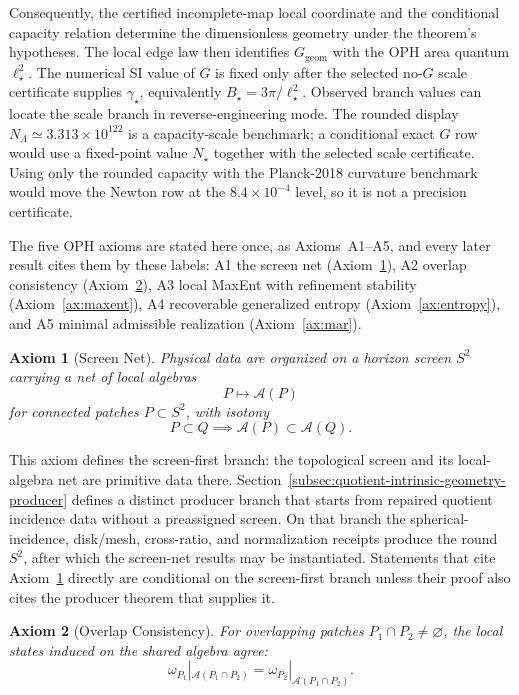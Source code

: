 \documentclass[11pt]{article}
\newtheorem{axiom}{Axiom}
\begin{document}
Consequently, the certified incomplete-map local coordinate and the conditional capacity relation
determine the dimensionless geometry under the theorem's hypotheses. The local edge
law then identifies \(G_{\mathrm{geom}}\) with the OPH area quantum \(\ell_\star^2\). The numerical
SI value of \(G\) is fixed only after the selected no-\(G\) scale certificate supplies
\(\gamma_\star\), equivalently \(B_\star=3\pi/\ell_\star^2\).
Observed branch values can locate the scale branch in reverse-engineering mode. The rounded display
\(N_{\Lambda}\simeq3.313\times10^{122}\) is a capacity-scale benchmark; a conditional exact \(G\)
row would use a fixed-point value \(N_\star\) together with the selected scale certificate. Using only
the rounded capacity with the Planck-2018 curvature benchmark would move the Newton row at the
\(8.4\times10^{-4}\) level, so it is not a precision certificate.

The five OPH axioms are stated here once, as Axioms~A1--A5, and every later
result cites them by these labels: A1 the screen net (Axiom~\ref{ax:screen}),
A2 overlap consistency (Axiom~\ref{ax:overlap}), A3 local MaxEnt with
refinement stability (Axiom~\ref{ax:maxent}), A4 recoverable generalized
entropy (Axiom~\ref{ax:entropy}), and A5 minimal admissible realization
(Axiom~\ref{ax:mar}).

\begin{axiom}[Screen Net]\label{ax:screen}
Physical data are organized on a horizon screen \(S^2\) carrying a net of local algebras
\[
P \longmapsto \mathcal A(P)
\]
for connected patches \(P\subset S^2\), with isotony
\[
P\subset Q \implies \mathcal A(P)\subset \mathcal A(Q).
\]
\end{axiom}

This axiom defines the screen-first branch: the topological screen and its local-algebra net are
primitive data there. Section~\ref{subsec:quotient-intrinsic-geometry-producer} defines a distinct
producer branch that starts from repaired quotient incidence data without a preassigned screen.
On that branch the spherical-incidence, disk/mesh, cross-ratio, and normalization receipts produce
the round \(S^2\), after which the screen-net results may be instantiated. Statements that cite
Axiom~\ref{ax:screen} directly are conditional on the screen-first branch unless their proof
also cites the producer theorem that supplies it.

\begin{axiom}[Overlap Consistency]\label{ax:overlap}
For overlapping patches \(P_1\cap P_2\neq\varnothing\), the local states induced on the shared algebra agree:
\[
\omega_{P_1}|_{\mathcal A(P_1\cap P_2)}
=
\omega_{P_2}|_{\mathcal A(P_1\cap P_2)}.
\]
\end{axiom}
\end{document}

